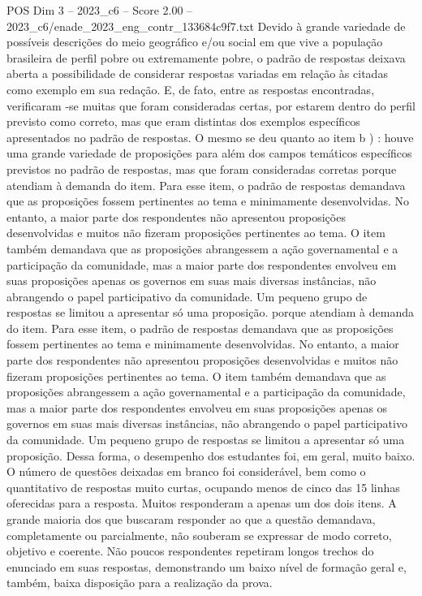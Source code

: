 \begin{textsample}{POS Dim 3 – 2023\_c6 – Score 2.00 – 2023\_c6/enade\_2023\_eng\_contr\_133684c9f7.txt}
Devido à grande variedade de possíveis descrições do meio geográfico e/ou social em que vive a população brasileira de perfil pobre ou extremamente pobre, o padrão de respostas deixava aberta a possibilidade de considerar respostas variadas em relação às citadas como exemplo em sua redação.
E, de fato, entre as respostas encontradas, verificaram -se muitas que foram consideradas certas, por estarem dentro do perfil previsto como correto, mas que eram distintas dos exemplos específicos apresentados no padrão de respostas.
O mesmo se deu quanto ao item b ) : houve uma grande variedade de proposições para além dos campos temáticos específicos previstos no padrão de respostas, mas que foram consideradas corretas porque atendiam à demanda do item.
Para esse item, o padrão de respostas demandava que as proposições fossem pertinentes ao tema e minimamente desenvolvidas.
No entanto, a maior parte dos respondentes não apresentou proposições desenvolvidas e muitos não fizeram proposições pertinentes ao tema.
O item também demandava que as proposições abrangessem a ação governamental e a participação da comunidade, mas a maior parte dos respondentes envolveu em suas proposições apenas os governos em suas mais diversas instâncias, não abrangendo o papel participativo da comunidade.
Um pequeno grupo de respostas se limitou a apresentar só uma proposição. porque atendiam à demanda do item.
Para esse item, o padrão de respostas demandava que as proposições fossem pertinentes ao tema e minimamente desenvolvidas.
No entanto, a maior parte dos respondentes não apresentou proposições desenvolvidas e muitos não fizeram proposições pertinentes ao tema.
O item também demandava que as proposições abrangessem a ação governamental e a participação da comunidade, mas a maior parte dos respondentes envolveu em suas proposições apenas os governos em suas mais diversas instâncias, não abrangendo o papel participativo da comunidade.
Um pequeno grupo de respostas se limitou a apresentar só uma proposição.
Dessa forma, o desempenho dos estudantes foi, em geral, muito baixo.
O número de questões deixadas em branco foi considerável, bem como o quantitativo de respostas muito curtas, ocupando menos de cinco das 15 linhas oferecidas para a resposta.
Muitos responderam a apenas um dos dois itens.
A grande maioria dos que buscaram responder ao que a questão demandava, completamente ou parcialmente, não souberam se expressar de modo correto, objetivo e coerente.
Não poucos respondentes repetiram longos trechos do enunciado em suas respostas, demonstrando um baixo nível de formação geral e, também, baixa disposição para a realização da prova.

\end{textsample}
